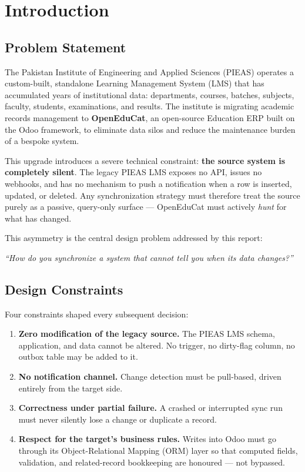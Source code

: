 \documentclass[11pt,a4paper]{article}
\begin{document}
\newpage

\section{Introduction}

\subsection{Problem Statement}
The Pakistan Institute of Engineering and Applied Sciences (PIEAS) operates a custom-built, standalone Learning Management System (LMS) that has accumulated years of institutional data: departments, courses, batches, subjects, faculty, students, examinations, and results. The institute is migrating academic records management to \textbf{OpenEduCat}, an open-source Education ERP built on the Odoo framework, to eliminate data silos and reduce the maintenance burden of a bespoke system.

This upgrade introduces a severe technical constraint: \textbf{the source system is completely silent}. The legacy PIEAS LMS exposes no API, issues no webhooks, and has no mechanism to push a notification when a row is inserted, updated, or deleted. Any synchronization strategy must therefore treat the source purely as a passive, query-only surface --- OpenEduCat must actively \emph{hunt} for what has changed.

This asymmetry is the central design problem addressed by this report:
\begin{center}
\textit{``How do you synchronize a system that cannot tell you when its data changes?''}
\end{center}

\subsection{Design Constraints}
Four constraints shaped every subsequent decision:
\begin{enumerate}
  \item \textbf{Zero modification of the legacy source.} The PIEAS LMS schema, application, and data cannot be altered. No trigger, no dirty-flag column, no outbox table may be added to it.
  \item \textbf{No notification channel.} Change detection must be pull-based, driven entirely from the target side.
  \item \textbf{Correctness under partial failure.} A crashed or interrupted sync run must never silently lose a change or duplicate a record.
  \item \textbf{Respect for the target's business rules.} Writes into Odoo must go through its Object-Relational Mapping (ORM) layer so that computed fields, validation, and related-record bookkeeping are honoured --- not bypassed.
\end{enumerate}
\end{document}
